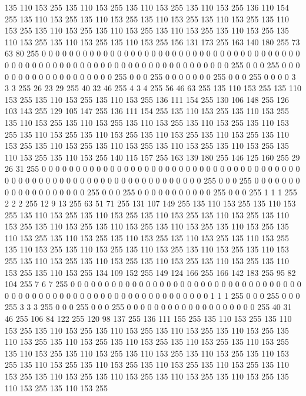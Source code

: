 135 110 153 255 135 110 153 255 135 110 153 255 135 110 153 255 136 110 154 255 135 110 153 255 135 110 153 255 135 110 153 255 135 110 153 255 135 110 153 255 135 110 153 255 135 110 153 255 135 110 153 255 135 110 153 255 135 110 153 255 135 110 153 255
135 110 153 255 156 131 173 255 163 140 180 255 73 63 80 255 0 0 0 0 0 0 0 0 0 0 0 0 0 0 0 0 0 0 0 0 0 0 0 0 0 0 0 0 0 0 0 0 0 0 0 0 0 0 0 0 0 0 0 0 0 0 0 0
0 0 0 0 0 0 0 0 0 0 0 0 0 0 0 0 0 0 0 0 0 0 0 255 0 0 0 255 0 0 0 0 0 0 0 0 0 0 0 0 0 0 0 0 0 0 0 255 0 0 0 255 0 0 0 0 0 0 0 255 0 0 0 255
0 0 0 0 3 3 3 255 26 23 29 255 40 32 46 255 4 3 4 255 56 46 63 255 135 110 153 255 135 110 153 255 135 110 153 255 135 110 153 255 136 111 154 255 130 106 148 255 126 103 143 255 129 105 147 255 136 111 154 255 135 110 153 255
135 110 153 255 135 110 153 255 135 110 153 255 135 110 153 255 135 110 153 255 135 110 153 255 135 110 153 255 135 110 153 255 135 110 153 255 135 110 153 255 135 110 153 255 135 110 153 255 135 110 153 255 135 110 153 255 135 110 153 255 135 110 153 255
135 110 153 255 140 115 157 255 163 139 180 255 146 125 160 255 29 26 31 255 0 0 0 0 0 0 0 0 0 0 0 0 0 0 0 0 0 0 0 0 0 0 0 0 0 0 0 0 0 0 0 0 0 0 0 0 0 0 0 0 0 0 0 0
0 0 0 0 0 0 0 0 0 0 0 0 0 0 0 0 0 0 0 0 0 0 0 255 0 0 0 255 0 0 0 0 0 0 0 0 0 0 0 0 0 0 0 0 0 0 0 255 0 0 0 255 0 0 0 0 0 0 0 0 0 0 0 255
0 0 0 255 1 1 1 255 2 2 2 255 12 9 13 255 63 51 71 255 131 107 149 255 135 110 153 255 135 110 153 255 135 110 153 255 135 110 153 255 135 110 153 255 135 110 153 255 135 110 153 255 135 110 153 255 135 110 153 255 135 110 153 255
135 110 153 255 135 110 153 255 135 110 153 255 135 110 153 255 135 110 153 255 135 110 153 255 135 110 153 255 135 110 153 255 135 110 153 255 135 110 153 255 135 110 153 255 135 110 153 255 135 110 153 255 135 110 153 255 135 110 153 255 135 110 153 255
135 110 153 255 134 109 152 255 149 124 166 255 166 142 183 255 95 82 104 255 7 6 7 255 0 0 0 0 0 0 0 0 0 0 0 0 0 0 0 0 0 0 0 0 0 0 0 0 0 0 0 0 0 0 0 0 0 0 0 0 0 0 0 0
0 0 0 0 0 0 0 0 0 0 0 0 0 0 0 0 0 0 0 0 0 0 0 0 1 1 1 255 0 0 0 255 0 0 0 255 3 3 3 255 0 0 0 255 0 0 0 255 0 0 0 0 0 0 0 0 0 0 0 0 0 0 0 0
0 0 0 255 40 31 46 255 106 84 122 255 120 98 137 255 136 111 155 255 135 110 153 255 135 110 153 255 135 110 153 255 135 110 153 255 135 110 153 255 135 110 153 255 135 110 153 255 135 110 153 255 135 110 153 255 135 110 153 255 135 110 153 255
135 110 153 255 135 110 153 255 135 110 153 255 135 110 153 255 135 110 153 255 135 110 153 255 135 110 153 255 135 110 153 255 135 110 153 255 135 110 153 255 135 110 153 255 135 110 153 255 135 110 153 255 135 110 153 255 135 110 153 255 135 110 153 255
